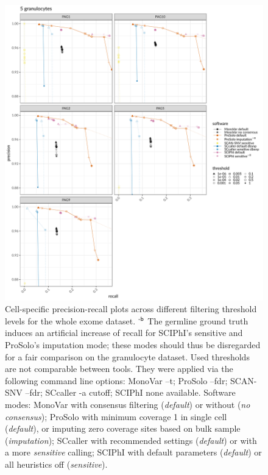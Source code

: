 \documentclass[authoryear,preprint,11pt]{scrartcl}
\begin{document}
\begin{figure}[!tpb]
  \includegraphics[width=\linewidth]{figs/Laehnemann2017/Laehnemann2017_prosolo-monovar-scansnv-sccaller-sciphi_per-cell_prec-rec.pdf}
 \caption{
 Cell-specific precision-recall plots across different filtering threshold levels for the whole exome dataset.\newline \footnotesize
  $^\text{\sffamily-b}$ The germline ground truth induces an artificial increase of recall for SCIPhI's sensitive and ProSolo's imputation mode; these modes should thus be disregarded for a fair comparison on the granulocyte dataset.\newline
  Used thresholds are not comparable between tools.
  They were applied via the following command line options:
  MonoVar {\ttfamily --t};
  ProSolo {\ttfamily --fdr};
  SCAN-SNV {\ttfamily --fdr};
  SCcaller {\ttfamily -a cutoff};
  SCIPhI {\ttfamily none available}.
  Software modes:
  MonoVar with consensus filtering ({\itshape default}) or without ({\itshape no consensus});
  ProSolo with minimum coverage 1 in single cell ({\itshape default}), or imputing zero coverage sites based on bulk sample ({\itshape imputation});
  SCcaller with recommended settings ({\itshape default}) or with a more {\itshape sensitive} calling;
  SCIPhI with default parameters ({\itshape default}) or all heuristics off ({\itshape sensitive}).
 }
 \label{fig:per-cell_prec-rec_Laehnemann2017}
\end{figure}
\end{document}
